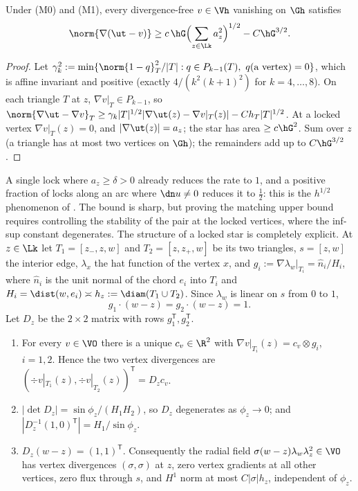 \begin{theorem}\label{thm:st:count}
Under (M0) and (M1), every divergence-free $v\in\Vh$ vanishing on $\Gh$ satisfies
\[
\norm{\nabla(\ut-v)}\ge c\,\hG\Bigl(\sum_{z\in\Lk}a_z^2\Bigr)^{1/2}-C\hG^{3/2}.
\]
\end{theorem}

\begin{proof}
Let $\gamma_k^2:=\min\{\norm{1-q}^2_T/|T|:q\in P_{k-1}(T),\ q(\text{a vertex})=0\}$, which is affine invariant and positive (exactly $4/(k^2(k+1)^2)$ for $k=4,\dots,8$). On each triangle $T$ at $z$, $\nabla v|_T\in P_{k-1}$, so $\norm{\nabla\ut-\nabla v}_T\ge\gamma_k|T|^{1/2}|\nabla\ut(z)-\nabla v|_T(z)|-Ch_T|T|^{1/2}$. At a locked vertex $\nabla v|_T(z)=0$, and $|\nabla\ut(z)|=a_z$; the star has area $\ge c\hG^2$. Sum over $z$ (a triangle has at most two vertices on $\Gh$); the remainders add up to $C\hG^{3/2}$.
\end{proof}

A single lock where $a_z\ge\delta>0$ already reduces the rate to $1$, and a positive fraction of locks along an arc where $\dn u\ne0$ reduces it to $\frac12$: this is the $h^{1/2}$ phenomenon of \cite{ScottPrize,GjerdeScott2024}. The bound is sharp, but proving the matching upper bound requires controlling the stability of the pair at the locked vertices, where the inf-sup constant degenerates. The structure of a locked star is completely explicit. At $z\in\Lk$ let $T_1=[z_-,z,w]$ and $T_2=[z,z_+,w]$ be its two triangles, $s=[z,w]$ the interior edge, $\lambda_x$ the hat function of the vertex $x$, and $g_i:=\nabla\lambda_w|_{T_i}=\hat n_i/H_i$, where $\hat n_i$ is the unit normal of the chord $e_i$ into $T_i$ and $H_i=\dist(w,e_i)\asymp h_z:=\diam(T_1\cup T_2)$. Since $\lambda_w$ is linear on $s$ from $0$ to $1$,
\begin{equation}\label{eq:st:gs}
g_1\cdot(w-z)=g_2\cdot(w-z)=1 .
\end{equation}
Let $D_z$ be the $2\times2$ matrix with rows $g_1^{\mathsf T},g_2^{\mathsf T}$.

\begin{lemma}\label{lem:st:K}
\begin{enumerate}[label=(\alph*)]
\item For every $v\in\VO$ there is a unique $c_v\in\R^2$ with $\nabla v|_{T_i}(z)=c_v\otimes g_i$, $i=1,2$. Hence the two vertex divergences are $(\div v|_{T_1}(z),\div v|_{T_2}(z))^{\mathsf T}=D_zc_v$.
\item $|\det D_z|=\sin\phi_z/(H_1H_2)$, so $D_z$ degenerates as $\phi_z\to0$; and $|D_z^{-1}(1,0)^{\mathsf T}|=H_1/\sin\phi_z$.
\item $D_z(w-z)=(1,1)^{\mathsf T}$. Consequently the radial field $\sigma(w-z)\lambda_w\lambda_z^2\in\VO$ has vertex divergences $(\sigma,\sigma)$ at $z$, zero vertex gradients at all other vertices, zero flux through $s$, and $H^1$ norm at most $C|\sigma|h_z$, independent of $\phi_z$.
\end{enumerate}
\end{lemma}

